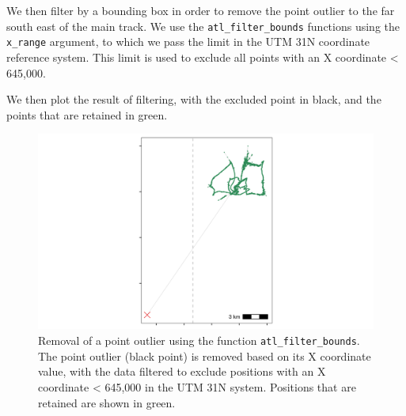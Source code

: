 \documentclass[
]{scrartcl}
\newenvironment{Shaded}{}{}
\newcommand{\CommentTok}[1]{\textcolor[rgb]{0.38,0.63,0.69}{\textit{#1}}}
\newcommand{\DataTypeTok}[1]{\textcolor[rgb]{0.56,0.13,0.00}{#1}}
\newcommand{\DecValTok}[1]{\textcolor[rgb]{0.25,0.63,0.44}{#1}}
\newcommand{\KeywordTok}[1]{\textcolor[rgb]{0.00,0.44,0.13}{\textbf{#1}}}
\newcommand{\NormalTok}[1]{#1}
\newcommand{\OperatorTok}[1]{\textcolor[rgb]{0.40,0.40,0.40}{#1}}
\newcommand{\OtherTok}[1]{\textcolor[rgb]{0.00,0.44,0.13}{#1}}
\newcommand{\StringTok}[1]{\textcolor[rgb]{0.25,0.44,0.63}{#1}}
\begin{document}
We then filter by a bounding box in order to remove the point outlier to the far south east of the main track. We use the \texttt{atl\_filter\_bounds} functions using the \texttt{x\_range} argument, to which we pass the limit in the UTM 31N coordinate reference system.
This limit is used to exclude all points with an X coordinate \textless{} 645,000.

We then plot the result of filtering, with the excluded point in black, and the points that are retained in green.

\begin{Shaded}
\end{Shaded}

\begin{figure}
\centering
\includegraphics{figures/fig_calib_bbox.png}
\caption{Removal of a point outlier using the function \texttt{atl\_filter\_bounds}. The point outlier (black point) is removed based on its X coordinate value, with the data filtered to exclude positions with an X coordinate \textless{} 645,000 in the UTM 31N system. Positions that are retained are shown in green.}
\end{figure}
\end{document}
